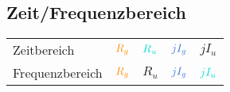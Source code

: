 \documentclass[a4paper, 12pt]{article}
\begin{document}
\subsection{Zeit/Frequenzbereich}

\begin{tabular}{lllll}
    Zeitbereich &
    $\color{orange} R_g$  &
    $\color{turquoise} R_u$  &
    $\color{bluegray} jI_g$ &
    $jI_u$\\

    Frequenzbereich &
    $\color{orange} R_g$  &
    $R_u$  &
    $\color{bluegray}jI_g$ &
    $\color{turquoise}jI_u$\\
\end{tabular}
\end{document}
